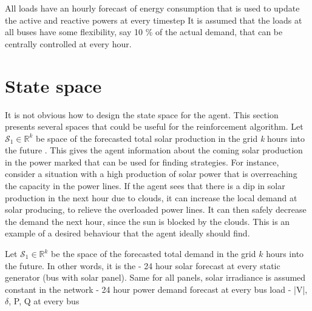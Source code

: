 \documentclass[class=book, crop=false]{standalone}
\begin{document}
All loads have an hourly forecast of energy consumption that is used to update the active and reactive powers at every timestep It is assumed that the loads at all buses have some flexibility, say 10 \% of the actual demand, that can be centrally controlled at every hour. 

\section{State space}
It is not obvious how to design the state space for the agent. This section presents several spaces that could be useful for the reinforcement algorithm. Let $\mathcal{S}_{1} \in \mathbb{R}^{k}$ be space of the forecasted total solar production in the grid \textit{k} hours into the future . This gives the agent information about the coming solar production in the power marked that can be used for finding strategies. For instance, consider a situation with a high production of solar power that is overreaching the capacity in the power lines. If the agent sees that there is a dip in solar production in the next hour due to clouds, it can increase the local demand at solar producing, to relieve the overloaded power lines. It can then safely decrease the demand the next hour, since the sun is blocked by the clouds. This is an example of a desired behaviour that the agent ideally should find. 


Let $\mathcal{S}_{1} \in \mathbb{R}^{k}$ be the space of the forecasted total demand in the grid $k$ hours into the future. In other words, it is the 
- 24 hour solar forecast at every static generator (bus with solar panel). Same for all panels, solar irradiance is assumed constant in the network
- 24 hour power demand forecast at every bus load
- |V|, $\delta$, P, Q at every bus
\end{document}
